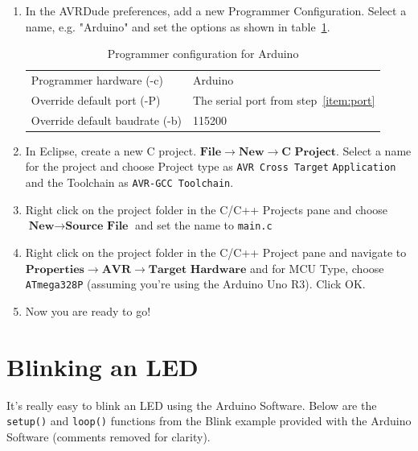 \documentclass[11pt,a4paper,titlepage]{article}
\begin{document}
\begin{enumerate}
	\item
	In the AVRDude preferences, add a new Programmer Configuration. Select a name, e.g. "Arduino" and set the options as shown in table~\ref{tab:hardwareconfig}.
	
	\begin{table}[h]
		\centering
		\begin{tabular}{ll}
			\toprule
				Programmer hardware (-c)	&	Arduino\\
				Override default port (-P)	&	The serial port from step~\ref{item:port}\\
				Override default baudrate (-b)	&	115200\\
			\bottomrule
		\end{tabular}
		\caption{Programmer configuration for Arduino}
		\label{tab:hardwareconfig}		
	\end{table}	
	
	\item
	In Eclipse, create a new C project. $\textbf{File} \rightarrow \textbf{New} \rightarrow \textbf{C Project}$. Select a name for the project and choose Project type as \verb|AVR Cross Target| \verb|Application| and the Toolchain as \verb|AVR-GCC Toolchain|.
	
	\item
	Right click on the project folder in the C/C++ Projects pane and choose $\textbf{New} \rightarrow \textbf{Source File}$ and set the name to \verb|main.c|
	
	\item
	Right click on the project folder in the C/C++ Project pane and navigate to $\textbf{Properties} \rightarrow \textbf{AVR} \rightarrow \textbf{Target Hardware}$ and for MCU Type, choose \verb|ATmega328P| (assuming you're using the Arduino Uno R3). Click OK.
	
	\item
	Now you are ready to go!
\end{enumerate}

\section{Blinking an LED}

It's really easy to blink an LED using the Arduino Software. Below are the \verb|setup()| and \verb|loop()| functions from the Blink example provided with the Arduino Software (comments removed for clarity).

\vspace{2mm}

\vspace{2mm}
\end{document}
